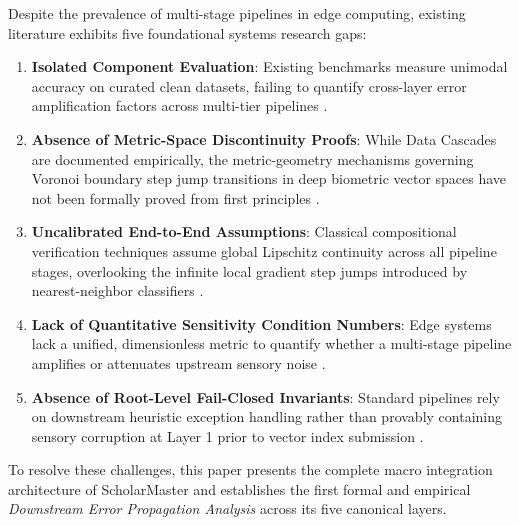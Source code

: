 \documentclass[conference]{IEEEtran}
\begin{document}
Despite the prevalence of multi-stage pipelines in edge computing, existing literature exhibits five foundational systems research gaps:
\begin{enumerate}
    \item \textbf{Isolated Component Evaluation}: Existing benchmarks measure unimodal accuracy on curated clean datasets, failing to quantify cross-layer error amplification factors across multi-tier pipelines \cite{he2016deep, vaswani2017attention}.
    \item \textbf{Absence of Metric-Space Discontinuity Proofs}: While Data Cascades are documented empirically, the metric-geometry mechanisms governing Voronoi boundary step jump transitions in deep biometric vector spaces have not been formally proved from first principles \cite{sambasivan2021everyone, aurenhammer1991voronoi}.
    \item \textbf{Uncalibrated End-to-End Assumptions}: Classical compositional verification techniques assume global Lipschitz continuity across all pipeline stages, overlooking the infinite local gradient step jumps introduced by nearest-neighbor classifiers \cite{szegedy2013intriguing, weng2018towards}.
    \item \textbf{Lack of Quantitative Sensitivity Condition Numbers}: Edge systems lack a unified, dimensionless metric to quantify whether a multi-stage pipeline amplifies or attenuates upstream sensory noise \cite{kang2017noscope}.
    \item \textbf{Absence of Root-Level Fail-Closed Invariants}: Standard pipelines rely on downstream heuristic exception handling rather than provably containing sensory corruption at Layer 1 prior to vector index submission \cite{kumar2026scholar22, kumar2026scholar24}.
\end{enumerate}

To resolve these challenges, this paper presents the complete macro integration architecture of ScholarMaster and establishes the first formal and empirical \textit{Downstream Error Propagation Analysis} across its five canonical layers. 
\end{document}
